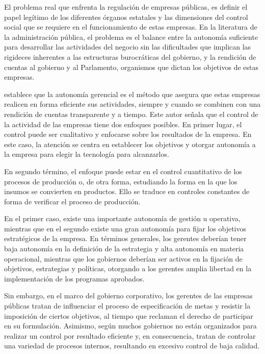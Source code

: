 \documentclass[
  12pt,
  spanish,
]{book}
\begin{document}
El problema real que enfrenta la regulación de empresas públicas, es definir el papel legítimo de los diferentes órganos estatales y las dimensiones del control social que se requiere en el funcionamiento de estas empresas. En la literatura de la administración pública, el problema es el balance entre la autonomía suficiente para desarrollar las actividades del negocio sin las dificultades que implican las rigideces inherentes a las estructuras burocráticas del gobierno, y la rendición de cuentas al gobierno y al Parlamento, organismos que dictan los objetivos de estas empresas.

\citet{Ramamurti1991} establece que la autonomía gerencial es el método que asegura que estas empresas realicen en forma eficiente sus actividades, siempre y cuando se combinen con una rendición de cuentas transparente y a tiempo. Este autor señala que el control de la actividad de las empresas tiene dos enfoques posibles. En primer lugar, el control puede ser cualitativo y enfocarse sobre los resultados de la empresa. En este caso, la atención se centra en establecer los objetivos y otorgar autonomía a la empresa para elegir la tecnología para alcanzarlos.

En segundo término, el enfoque puede estar en el control cuantitativo de los procesos de producción o, de otra forma, estudiando la forma en la que los insumos se convierten en productos. Ello se traduce en controles constantes de forma de verificar el proceso de producción.

En el primer caso, existe una importante autonomía de gestión u operativa, mientras que en el segundo existe una gran autonomía para fijar los objetivos estratégicos de la empresa. En términos generales, los gerentes deberían tener baja autonomía en la definición de la estrategia y alta autonomía en materia operacional, mientras que los gobiernos deberían ser activos en la fijación de objetivos, estrategias y políticas, otorgando a los gerentes amplia libertad en la implementación de los programas aprobados.

Sin embargo, en el marco del gobierno corporativo, los gerentes de las empresas públicas tratan de influenciar el proceso de especificación de metas y resistir la imposición de ciertos objetivos, al tiempo que reclaman el derecho de participar en su formulación. Asimismo, según \citet{Jones1991} muchos gobiernos no están organizados para realizar un control por resultado eficiente y, en consecuencia, tratan de controlar una variedad de procesos internos, resultando en excesivo control de baja calidad.
\end{document}
